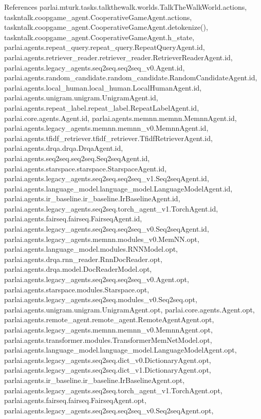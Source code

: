 References parlai.\+mturk.\+tasks.\+talkthewalk.\+worlds.\+Talk\+The\+Walk\+World.\+actions, taskntalk.\+coopgame\+\_\+agent.\+Cooperative\+Game\+Agent.\+actions, taskntalk.\+coopgame\+\_\+agent.\+Cooperative\+Game\+Agent.\+detokenize(), taskntalk.\+coopgame\+\_\+agent.\+Cooperative\+Game\+Agent.\+h\+\_\+state, parlai.\+agents.\+repeat\+\_\+query.\+repeat\+\_\+query.\+Repeat\+Query\+Agent.\+id, parlai.\+agents.\+retriever\+\_\+reader.\+retriever\+\_\+reader.\+Retriever\+Reader\+Agent.\+id, parlai.\+agents.\+legacy\+\_\+agents.\+seq2seq.\+seq2seq\+\_\+v0.\+Agent.\+id, parlai.\+agents.\+random\+\_\+candidate.\+random\+\_\+candidate.\+Random\+Candidate\+Agent.\+id, parlai.\+agents.\+local\+\_\+human.\+local\+\_\+human.\+Local\+Human\+Agent.\+id, parlai.\+agents.\+unigram.\+unigram.\+Unigram\+Agent.\+id, parlai.\+agents.\+repeat\+\_\+label.\+repeat\+\_\+label.\+Repeat\+Label\+Agent.\+id, parlai.\+core.\+agents.\+Agent.\+id, parlai.\+agents.\+memnn.\+memnn.\+Memnn\+Agent.\+id, parlai.\+agents.\+legacy\+\_\+agents.\+memnn.\+memnn\+\_\+v0.\+Memnn\+Agent.\+id, parlai.\+agents.\+tfidf\+\_\+retriever.\+tfidf\+\_\+retriever.\+Tfidf\+Retriever\+Agent.\+id, parlai.\+agents.\+drqa.\+drqa.\+Drqa\+Agent.\+id, parlai.\+agents.\+seq2seq.\+seq2seq.\+Seq2seq\+Agent.\+id, parlai.\+agents.\+starspace.\+starspace.\+Starspace\+Agent.\+id, parlai.\+agents.\+legacy\+\_\+agents.\+seq2seq.\+seq2seq\+\_\+v1.\+Seq2seq\+Agent.\+id, parlai.\+agents.\+language\+\_\+model.\+language\+\_\+model.\+Language\+Model\+Agent.\+id, parlai.\+agents.\+ir\+\_\+baseline.\+ir\+\_\+baseline.\+Ir\+Baseline\+Agent.\+id, parlai.\+agents.\+legacy\+\_\+agents.\+seq2seq.\+torch\+\_\+agent\+\_\+v1.\+Torch\+Agent.\+id, parlai.\+agents.\+fairseq.\+fairseq.\+Fairseq\+Agent.\+id, parlai.\+agents.\+legacy\+\_\+agents.\+seq2seq.\+seq2seq\+\_\+v0.\+Seq2seq\+Agent.\+id, parlai.\+agents.\+legacy\+\_\+agents.\+memnn.\+modules\+\_\+v0.\+Mem\+N\+N.\+opt, parlai.\+agents.\+language\+\_\+model.\+modules.\+R\+N\+N\+Model.\+opt, parlai.\+agents.\+drqa.\+rnn\+\_\+reader.\+Rnn\+Doc\+Reader.\+opt, parlai.\+agents.\+drqa.\+model.\+Doc\+Reader\+Model.\+opt, parlai.\+agents.\+legacy\+\_\+agents.\+seq2seq.\+seq2seq\+\_\+v0.\+Agent.\+opt, parlai.\+agents.\+starspace.\+modules.\+Starspace.\+opt, parlai.\+agents.\+legacy\+\_\+agents.\+seq2seq.\+modules\+\_\+v0.\+Seq2seq.\+opt, parlai.\+agents.\+unigram.\+unigram.\+Unigram\+Agent.\+opt, parlai.\+core.\+agents.\+Agent.\+opt, parlai.\+agents.\+remote\+\_\+agent.\+remote\+\_\+agent.\+Remote\+Agent\+Agent.\+opt, parlai.\+agents.\+legacy\+\_\+agents.\+memnn.\+memnn\+\_\+v0.\+Memnn\+Agent.\+opt, parlai.\+agents.\+transformer.\+modules.\+Transformer\+Mem\+Net\+Model.\+opt, parlai.\+agents.\+language\+\_\+model.\+language\+\_\+model.\+Language\+Model\+Agent.\+opt, parlai.\+agents.\+legacy\+\_\+agents.\+seq2seq.\+dict\+\_\+v0.\+Dictionary\+Agent.\+opt, parlai.\+agents.\+legacy\+\_\+agents.\+seq2seq.\+dict\+\_\+v1.\+Dictionary\+Agent.\+opt, parlai.\+agents.\+ir\+\_\+baseline.\+ir\+\_\+baseline.\+Ir\+Baseline\+Agent.\+opt, parlai.\+agents.\+legacy\+\_\+agents.\+seq2seq.\+torch\+\_\+agent\+\_\+v1.\+Torch\+Agent.\+opt, parlai.\+agents.\+fairseq.\+fairseq.\+Fairseq\+Agent.\+opt, parlai.\+agents.\+legacy\+\_\+agents.\+seq2seq.\+seq2seq\+\_\+v0.\+Seq2seq\+Agent.\+opt, 